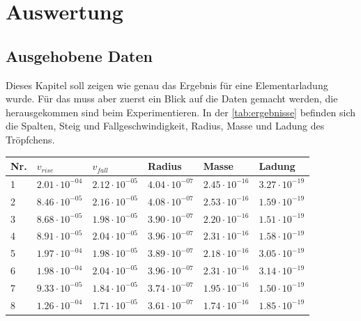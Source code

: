 \chapter{Auswertung}\label{cha:auswertung}
\section{Ausgehobene Daten}\label{sec:aushebungDaten}
Dieses Kapitel soll zeigen wie genau das Ergebnis für eine Elementarladung wurde. Für das muss aber zuerst ein Blick auf die Daten gemacht werden, die herausgekommen sind beim Experimentieren. In der \autoref{tab:ergebnisse} befinden sich die Spalten, Steig und Fallgeschwindigkeit, Radius, Masse und Ladung des Tröpfchens. 

\begin{table}[h]
	\centering
	\begin{tabular}{llllll}
		\toprule
		Nr. & $v_{rise}$ & $v_{fall}$ & Radius & Masse & Ladung \\
		\midrule
		1 &$\mathrm{2.01 \cdot 10^{-04}}$ & $\mathrm{2.12 \cdot 10^{-05}}$ & $\mathrm{4.04 \cdot 10^{-07}}$ & $\mathrm{2.45 \cdot 10^{-16}}$ & $\mathrm{3.27 \cdot 10^{-19}}$ \\
		2 &$\mathrm{8.46 \cdot 10^{-05}}$ & $\mathrm{2.16 \cdot 10^{-05}}$ & $\mathrm{4.08 \cdot 10^{-07}}$ & $\mathrm{2.53 \cdot 10^{-16}}$ & $\mathrm{1.59 \cdot 10^{-19}}$ \\
		3 &$\mathrm{8.68 \cdot 10^{-05}}$ & $\mathrm{1.98 \cdot 10^{-05}}$ & $\mathrm{3.90 \cdot 10^{-07}}$ & $\mathrm{2.20 \cdot 10^{-16}}$ & $\mathrm{1.51 \cdot 10^{-19}}$ \\
		4 &$\mathrm{8.91 \cdot 10^{-05}}$ & $\mathrm{2.04 \cdot 10^{-05}}$ & $\mathrm{3.96 \cdot 10^{-07}}$ & $\mathrm{2.31 \cdot 10^{-16}}$ & $\mathrm{1.58 \cdot 10^{-19}}$ \\
		5 &$\mathrm{1.97 \cdot 10^{-04}}$ & $\mathrm{1.98 \cdot 10^{-05}}$ & $\mathrm{3.89 \cdot 10^{-07}}$ & $\mathrm{2.18 \cdot 10^{-16}}$ & $\mathrm{3.05 \cdot 10^{-19}}$ \\
		6 &$\mathrm{1.98 \cdot 10^{-04}}$ & $\mathrm{2.04 \cdot 10^{-05}}$ & $\mathrm{3.96 \cdot 10^{-07}}$ & $\mathrm{2.31 \cdot 10^{-16}}$ & $\mathrm{3.14 \cdot 10^{-19}}$ \\
		7 &$\mathrm{9.33 \cdot 10^{-05}}$ & $\mathrm{1.84 \cdot 10^{-05}}$ & $\mathrm{3.74 \cdot 10^{-07}}$ & $\mathrm{1.95 \cdot 10^{-16}}$ & $\mathrm{1.50 \cdot 10^{-19}}$ \\
		8 &$\mathrm{1.26 \cdot 10^{-04}}$ & $\mathrm{1.71 \cdot 10^{-05}}$ & $\mathrm{3.61 \cdot 10^{-07}}$ & $\mathrm{1.74 \cdot 10^{-16}}$ & $\mathrm{1.85 \cdot 10^{-19}}$ \\

\end{tabular}
\end{table}
